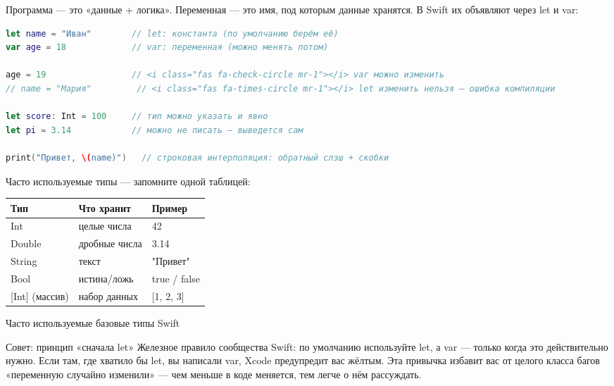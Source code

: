 


Программа — это «данные + логика». Переменная — это имя, под которым данные хранятся. В Swift их объявляют через let и var:

\begin{lstlisting}[language=Swift]
let name = "Иван"        // let: константа (по умолчанию берём её)
var age = 18             // var: переменная (можно менять потом)

age = 19                 // <i class="fas fa-check-circle mr-1"></i> var можно изменить
// name = "Мария"         // <i class="fas fa-times-circle mr-1"></i> let изменить нельзя — ошибка компиляции

let score: Int = 100     // тип можно указать и явно
let pi = 3.14            // можно не писать — выведется сам

print("Привет, \(name)")   // строковая интерполяция: обратный слэш + скобки
\end{lstlisting}

Часто используемые типы — запомните одной таблицей:

\begin{center}
\begin{tabularx}{\linewidth}{|X|X|X|}
\hline
\textbf{Тип} & \textbf{Что хранит} & \textbf{Пример} \tabularnewline
\hline
Int & целые числа & 42 \tabularnewline
Double & дробные числа & 3.14 \tabularnewline
String & текст & "Привет" \tabularnewline
Bool & истина/ложь & true / false \tabularnewline
{}[Int] (массив) & набор данных & {}[1, 2, 3] \tabularnewline
\hline
\end{tabularx}
\end{center}

\begin{center}\small\color{gray}Часто используемые базовые типы Swift\end{center}

\begin{tcbinfo}{Совет: принцип «сначала let»}
Железное правило сообщества Swift: по умолчанию используйте let, а var — только когда это действительно нужно. Если там, где хватило бы let, вы написали var, Xcode предупредит вас жёлтым. Эта привычка избавит вас от целого класса багов «переменную случайно изменили» — чем меньше в коде меняется, тем легче о нём рассуждать.

\end{tcbinfo}

